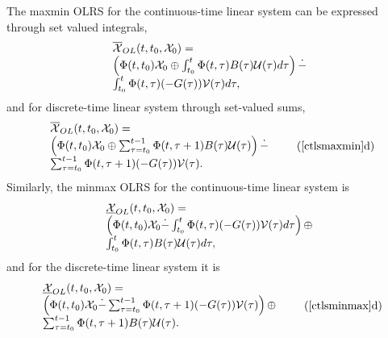 \documentclass[letterpaper,10pt,english]{sphinxmanual}
\begin{document}
The maxmin OLRS for the continuous-time linear system can be expressed
through set valued integrals,
\begin{gather}
\begin{split}\begin{array}{l}
\overline{{\mathcal X}}_{OL}(t, t_0, {\mathcal X}_0) = \\
\left(\Phi(t, t_0){\mathcal X}_0 \oplus
\int_{t_0}^t\Phi(t, \tau)B(\tau){\mathcal U}(\tau)d\tau\right) \dot{-} \\
\int_{t_0}^t\Phi(t, \tau)(-G(\tau)){\mathcal V}(\tau)d\tau,
\end{array}
\label{ctlsmaxmin}\end{split}\notag
\end{gather}
and for discrete-time linear system through set-valued sums,
\begin{gather}
\begin{split}\begin{array}{l}
\overline{{\mathcal X}}_{OL}(t, t_0, {\mathcal X}_0) = \\
\left(\Phi(t, t_0){\mathcal X}_0 \oplus
\sum_{\tau=t_0}^{t-1}\Phi(t, \tau+1)B(\tau){\mathcal U}(\tau)\right) \dot{-} \\
\sum_{\tau=t_0}^{t-1}\Phi(t, \tau+1)(-G(\tau)){\mathcal V}(\tau).
\end{array}
\tag*{(\ref{ctlsmaxmin}d)}
\label{dtlsmaxmin}\end{split}\notag
\end{gather}
Similarly, the minmax OLRS for the continuous-time linear system is
\begin{gather}
\begin{split}\begin{array}{l}
\underline{{\mathcal X}}_{OL}(t, t_0, {\mathcal X}_0) = \\
\left(\Phi(t, t_0){\mathcal X}_0 \dot{-}
\int_{t_0}^t\Phi(t, \tau)(-G(\tau)){\mathcal V}(\tau)d\tau\right)
\oplus \\
\int_{t_0}^t\Phi(t, \tau)B(\tau){\mathcal U}(\tau)d\tau,
\end{array}
\label{ctlsminmax}\end{split}\notag
\end{gather}
and for the discrete-time linear system it is
\begin{gather}
\begin{split}\begin{array}{l}
\underline{{\mathcal X}}_{OL}(t, t_0, {\mathcal X}_0) = \\
\left(\Phi(t, t_0){\mathcal X}_0 \dot{-}
\sum_{\tau=t_0}^{t-1}\Phi(t, \tau+1)(-G(\tau)){\mathcal V}(\tau)\right)
\oplus \\
\sum_{\tau=t_0}^{t-1}\Phi(t, \tau+1)B(\tau){\mathcal U}(\tau).
\end{array}
\tag*{(\ref{ctlsminmax}d)}
\label{dtlsminmax}\end{split}\notag
\end{gather}
\end{document}
